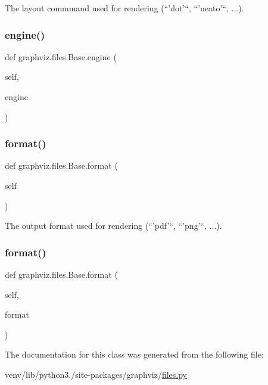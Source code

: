 \begin{DoxyVerb}The layout commmand used for rendering (``'dot'``, ``'neato'``, ...).\end{DoxyVerb}
 \mbox{\label{classgraphviz_1_1files_1_1Base_acb45da0b9b52d0a8cbb7b93fc52e1a0e}} 
\subsubsection{\texorpdfstring{engine()}{engine()}\hspace{0.1cm}{\footnotesize\ttfamily [2/2]}}
{\footnotesize\ttfamily def graphviz.\+files.\+Base.\+engine (\begin{DoxyParamCaption}\item[{}]{self,  }\item[{}]{engine }\end{DoxyParamCaption})}

\mbox{\label{classgraphviz_1_1files_1_1Base_a589f729bbe5a2aa199cc2627e45b493c}} 
\subsubsection{\texorpdfstring{format()}{format()}\hspace{0.1cm}{\footnotesize\ttfamily [1/2]}}
{\footnotesize\ttfamily def graphviz.\+files.\+Base.\+format (\begin{DoxyParamCaption}\item[{}]{self }\end{DoxyParamCaption})}

\begin{DoxyVerb}The output format used for rendering (``'pdf'``, ``'png'``, ...).\end{DoxyVerb}
 \mbox{\label{classgraphviz_1_1files_1_1Base_a35fddb8525bd66f653124718472f6dbd}} 
\subsubsection{\texorpdfstring{format()}{format()}\hspace{0.1cm}{\footnotesize\ttfamily [2/2]}}
{\footnotesize\ttfamily def graphviz.\+files.\+Base.\+format (\begin{DoxyParamCaption}\item[{}]{self,  }\item[{}]{format }\end{DoxyParamCaption})}



The documentation for this class was generated from the following file\+:\begin{DoxyCompactItemize}
\item 
venv/lib/python3./site-\/packages/graphviz/\hyperlink{files_8py}{files.\+py}\end{DoxyCompactItemize}
